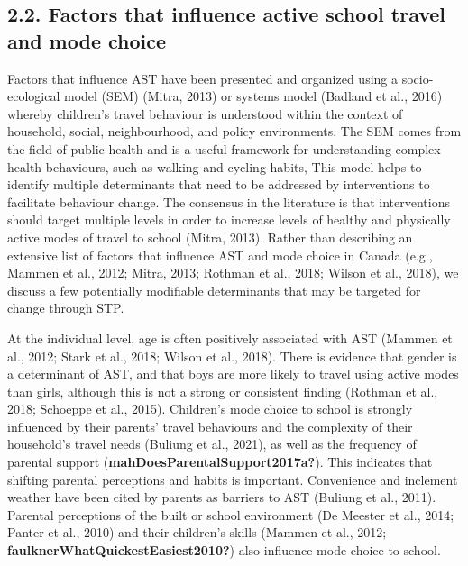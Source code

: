 \documentclass[]{elsarticle} %
\begin{document}
\hypertarget{factors-that-influence-active-school-travel-and-mode-choice}{%
\subsection{2.2. Factors that influence active school travel and mode
choice}\label{factors-that-influence-active-school-travel-and-mode-choice}}

Factors that influence AST have been presented and organized using a
socio-ecological model (SEM) (Mitra, 2013) or systems model (Badland et
al., 2016) whereby children's travel behaviour is understood within the
context of household, social, neighbourhood, and policy environments.
The SEM comes from the field of public health and is a useful framework
for understanding complex health behaviours, such as walking and cycling
habits, This model helps to identify multiple determinants that need to
be addressed by interventions to facilitate behaviour change. The
consensus in the literature is that interventions should target multiple
levels in order to increase levels of healthy and physically active
modes of travel to school (Mitra, 2013). Rather than describing an
extensive list of factors that influence AST and mode choice in Canada
(e.g., Mammen et al., 2012; Mitra, 2013; Rothman et al., 2018; Wilson et
al., 2018), we discuss a few potentially modifiable determinants that
may be targeted for change through STP.

At the individual level, age is often positively associated with AST
(Mammen et al., 2012; Stark et al., 2018; Wilson et al., 2018). There is
evidence that gender is a determinant of AST, and that boys are more
likely to travel using active modes than girls, although this is not a
strong or consistent finding (Rothman et al., 2018; Schoeppe et al.,
2015). Children's mode choice to school is strongly influenced by their
parents' travel behaviours and the complexity of their household's
travel needs (Buliung et al., 2021), as well as the frequency of
parental support (\textbf{mahDoesParentalSupport2017a?}). This indicates
that shifting parental perceptions and habits is important. Convenience
and inclement weather have been cited by parents as barriers to AST
(Buliung et al., 2011). Parental perceptions of the built or school
environment (De Meester et al., 2014; Panter et al., 2010) and their
children's skills (Mammen et al., 2012;
\textbf{faulknerWhatQuickestEasiest2010?}) also influence mode choice to
school.
\end{document}
